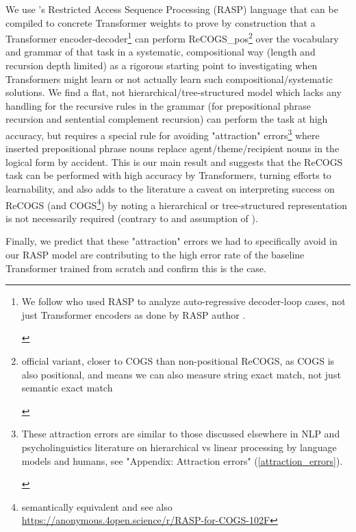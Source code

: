 \documentclass[11pt]{article}
\begin{document}
We use \cite{Weiss2021}'s Restricted Access Sequence Processing (RASP) language that can be compiled to concrete Transformer weights to prove by construction that a Transformer encoder-decoder\footnote{\begin{footnotesize}We follow \cite{Zhou2024} who used RASP to analyze auto-regressive decoder-loop cases, not just Transformer encoders as done by RASP author \cite{Weiss2021}.\end{footnotesize}} can perform ReCOGS\_pos\footnote{\begin{footnotesize}official variant, closer to COGS than non-positional ReCOGS, as COGS is also positional, and means we can also measure string exact match, not just semantic exact match\end{footnotesize}} over the vocabulary and grammar of that task in a systematic, compositional way (length and recursion depth limited) as a rigorous starting point to investigating when Transformers might learn or not actually learn such compositional/systematic solutions. We find a flat, not hierarchical/tree-structured model which lacks any handling for the recursive rules in the grammar (for prepositional phrase recursion and sentential complement recursion) can perform the task at high accuracy, but requires a special rule for avoiding "attraction" errors\footnote{\begin{footnotesize}These attraction errors are similar to those discussed elsewhere in NLP and psycholinguistics literature on hierarchical vs linear processing by language models and humans, see "Appendix: Attraction errors" (\ref{attraction_errors}).\end{footnotesize}} where inserted prepositional phrase nouns replace agent/theme/recipient nouns in the logical form by accident. This is our main result and suggests that the ReCOGS task can be performed with high accuracy by Transformers, turning efforts to learnability, and also adds to the literature a caveat on interpreting success on ReCOGS (and COGS\footnote{semantically equivalent and see also \href{https://anonymous.4open.science/r/RASP-for-COGS-102F}{https://anonymous.4open.science/r/RASP-for-COGS-102F}}) by noting a hierarchical or tree-structured representation is not necessarily required (contrary to \cite{KimLinzen2020} and assumption of \cite{murty2022characterizingintrinsiccompositionalitytransformers}).

Finally, we predict that these "attraction" errors we had to specifically avoid in our RASP model are contributing to the high error rate of the \cite{Wu2023} baseline Transformer trained from scratch and confirm this is the case.
\end{document}

